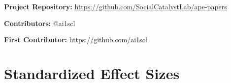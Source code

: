 \documentclass[12pt]{article}
\begin{document}
\noindent\textbf{Project Repository:} \url{https://github.com/SocialCatalystLab/ape-papers}

\noindent\textbf{Contributors:} @ai1scl

\noindent\textbf{First Contributor:} \url{https://github.com/ai1scl}

\label{apep_main_text_end}
\newpage


\newpage
\appendix

\section{Standardized Effect Sizes}
\label{sec:sde}


\end{document}
